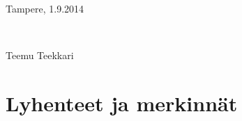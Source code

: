 \documentclass[12pt,a4paper,finnish]{tutthesis}
\begin{document}
~ 

Tampere, 1.9.2014

~


Teemu Teekkari



%
%

\renewcommand\contentsname{Sisällys}         %
\setcounter{tocdepth}{3}                      %
\tableofcontents                              %

\renewcommand\listfigurename{Kuvaluettelo}    %
\listoffigures                                 %
\markboth{}{}                                  %

\renewcommand\listtablename{Taulukkoluettelo} %
\listoftables                                  %
\markboth{}{}                                  %




%
%

\chapter*{Lyhenteet ja merkinnät}
\markboth{}{}                                %
\end{document}
